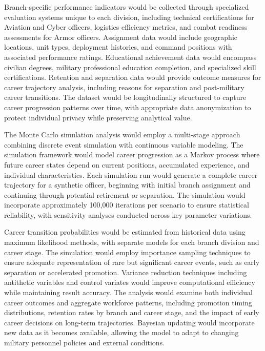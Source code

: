 \documentclass[main.tex]{subfiles}
\begin{document}
Branch-specific performance indicators would be collected through specialized evaluation systems unique to each division, including technical certifications for Aviation and Cyber officers, logistics efficiency metrics, and combat readiness assessments for Armor officers. Assignment data would include geographic locations, unit types, deployment histories, and command positions with associated performance ratings. Educational achievement data would encompass civilian degrees, military professional education completion, and specialized skill certifications. Retention and separation data would provide outcome measures for career trajectory analysis, including reasons for separation and post-military career transitions. The dataset would be longitudinally structured to capture career progression patterns over time, with appropriate data anonymization to protect individual privacy while preserving analytical value.


The Monte Carlo simulation analysis would employ a multi-stage approach combining discrete event simulation with continuous variable modeling. The simulation framework would model career progression as a Markov process where future career states depend on current positions, accumulated experience, and individual characteristics. Each simulation run would generate a complete career trajectory for a synthetic officer, beginning with initial branch assignment and continuing through potential retirement or separation. The simulation would incorporate approximately 100,000 iterations per scenario to ensure statistical reliability, with sensitivity analyses conducted across key parameter variations.

Career transition probabilities would be estimated from historical data using maximum likelihood methods, with separate models for each branch division and career stage. The simulation would employ importance sampling techniques to ensure adequate representation of rare but significant career events, such as early separation or accelerated promotion. Variance reduction techniques including antithetic variables and control variates would improve computational efficiency while maintaining result accuracy. The analysis would examine both individual career outcomes and aggregate workforce patterns, including promotion timing distributions, retention rates by branch and career stage, and the impact of early career decisions on long-term trajectories. Bayesian updating would incorporate new data as it becomes available, allowing the model to adapt to changing military personnel policies and external conditions.
\end{document}
